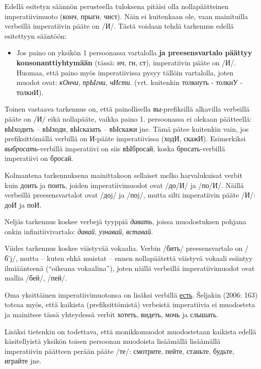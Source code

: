\documentclass[]{scrartcl}
\providecommand{\tightlist}{%
  \setlength{\itemsep}{0pt}\setlength{\parskip}{0pt}}
\begin{document}
Edellä esitetyn säännön perusteella tuloksena pitäisi olla
nollapäätteinen imperatiivimuoto (конч, прыгн, чист). Näin ei kuitenkaan
ole, vaan mainituilla verbeillä imperatiivin pääte on /И/. Tästä voidaan
tehdä tarkennus edellä esitettyyn sääntöön:

\begin{itemize}
\tightlist
\item
  Jos paino on yksikön 1 persoonassa vartalolla \textbf{ja
  preesensvartalo päättyy konsonanttiyhtymään} (tässä: нч, гн, ст),
  imperatiivin pääte on /И/. Huomaa, että paino myös imperatiivissa
  pysyy tällöin vartalolla, joten muodot ovat: \emph{кОнчи},
  \emph{прЫгни}, \emph{чИсти}. (vrt. kuitenkin толкнуть - толкнУ -
  толкнИ).
\end{itemize}

Toinen vastaava tarkennus on, että painollisella вы-prefiksillä
alkavilla verbeillä pääte on /И/ eikä nollapääte, vaikka paino 1.
persoonassa ei olekaan päätteellä: вЫходить -- вЫходи, вЫсказать --
вЫскажи jne. Tämä pätee kuitenkin vain, jos prefiksittömällä verbillä on
И-pääte imperatiivissa (ходИ, скажИ). Esimerkiksi
\emph{выбросать}-verbillä imperatiivi on siis вЫбросай, koska
бросать-verbillä imperatiivi on бросай.

Kolmantena tarkennuksena mainittakoon sellaiset melko harvalukuisat
verbit kuin доить ja поить, joiden imperatiivimuodot ovat /до/И/ ja
/по/И/. Näillä verbeillä preesensvartalot ovat /доj/ ja /поj/, mutta
silti imperatiivin pääte /И/: доИ ja поИ.

Neljäs tarkennus koskee verbejä tyyppiä \emph{давать}, joissa
muodostuksen pohjana onkin infinitiivivartalo: \emph{давай},
\emph{узнавай}, \emph{вставай}.

Viides tarkennus koskee väistyvää vokaalia. Verbin /бить/
preesensvartalo on /б'j/, mutta -- kuten ehkä muistat -- ennen
nollapäätettä väistyvä vokaali esiintyy ilmiäänteenä (``oikeana
vokaalina''), joten näillä verbeillä imperatiivimuodot ovat mallia
/бей/, /пей/.

Oma yksittäinen imperatiivimuotonsa on lisäksi verbillä
\href{http://ru.wiktionary.org/wiki/\%D0\%B5\%D1\%81\%D1\%82\%D1\%8C}{есть}.
Šeljakin (2006: 163) toteaa myös, että kaikista (prefiksittömistä)
verbeistä imperatiivia ei muodosteta ja mainitsee tässä yhteydessä
verbit хотеть, видеть, мочь ja слышать.

Lisäksi tietenkin on todettava, että monikkomuodot muodostetaan kaikista
edellä käsitellyistä yksikön toisen persoonan muodoista lisäämällä
lisäämällä imperatiivin päätteen perään pääte /те/: смотрите, пейте,
станьте, будьте, играйте jne.
\end{document}
